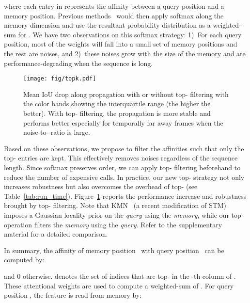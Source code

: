 \documentclass[final]{cvpr}
\begin{document}
	where each entry in  represents the affinity between a query position and a memory position. Previous methods~\cite{oh2019videoSTM, seong2020kernelizedMemory} would then apply softmax along the memory dimension and use the resultant probability distribution as a weighted-sum for . 
	We have two observations on this softmax strategy: 1)\ For each query position, most of the weights will fall into a small set of memory positions and the rest are noises, and 2)\ these noises grow with the size of the memory and are performance-degrading when the sequence is long. 
	
	\begin{figure}[t]
		\begin{center}
			\texttt{[image: fig/topk.pdf]}
		\end{center}
		\vspace{-0.1in}
		\caption{
			Mean IoU drop along propagation with or without top\protect\nobreakdash- filtering with the color bands showing the interquartile range (the higher the better). With top\protect\nobreakdash- filtering, the propagation is more stable and performs better especially for temporally far away frames when the noise-to- ratio is large.
		}
		\label{fig:topk}
		\vspace{-0.15in}
	\end{figure}
	
	Based on these observations, we propose to filter the affinities such that only the top- entries are kept. 
	This effectively removes noises regardless of the sequence length. 
	Since softmax preserves order, we can apply top- filtering beforehand to reduce the number of expensive  calls. 
	In practice, our new top- strategy not only increases robustness but also overcomes the overhead of top- (see Table~\ref{tab:run_time}). Figure~\ref{fig:topk} reports the performance increase and robustness brought by top- filtering.
	Note that KMN~\cite{seong2020kernelizedMemory} (a recent modification of STM) imposes a Gaussian locality prior on the \emph{query} using the \emph{memory}, while our top- operation filters the \emph{memory} using the \emph{query}. Refer to the supplementary material for a detailed comparison.
	
	In summary, the affinity of memory position~ with query position~ can be computed by:
	
	and 0 otherwise.  denotes the set of indices that are top- in the -th column of .
	These attentional weights are used to compute a weighted-sum of . For query position , the feature  is read from memory by:
	\vspace{-0.1in}
	
\end{document}
